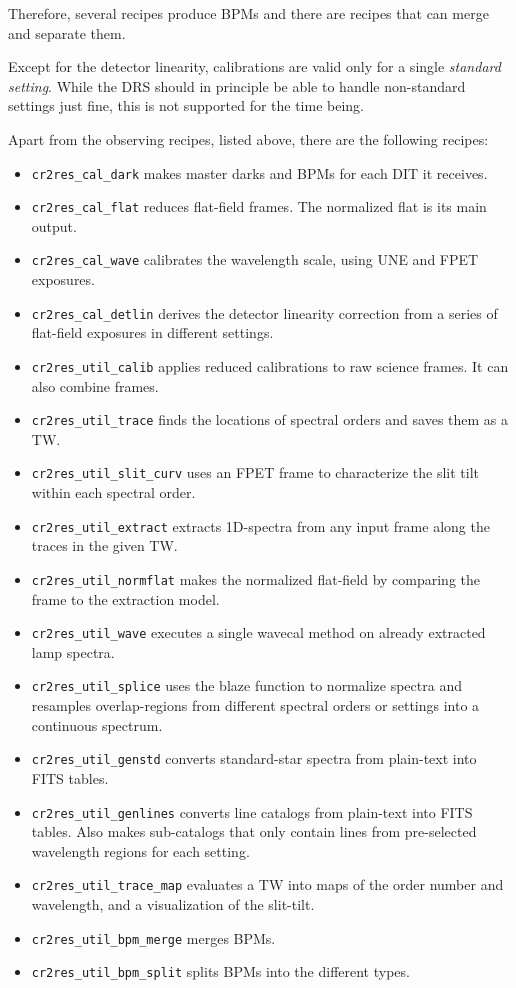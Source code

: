 Therefore, several recipes produce BPMs and there are recipes that can merge
and separate them.

Except for the detector linearity, calibrations are valid only for a
single \textit{standard setting}. While the DRS should in principle be able to
handle non-standard settings just fine, this is not supported for the time
being.

Apart from the observing recipes, listed above, there are the following recipes:

\begin{itemize}
    \item \texttt{cr2res\_cal\_dark} makes master darks and BPMs for each DIT it
    receives.
    \item \texttt{cr2res\_cal\_flat} reduces flat-field frames. The normalized
    flat is its main output.
    \item \texttt{cr2res\_cal\_wave} calibrates the wavelength scale, using UNE
    and FPET exposures.
    \item \texttt{cr2res\_cal\_detlin} derives the detector linearity correction
    from a series of flat-field exposures in different settings.
    \item \texttt{cr2res\_util\_calib} applies reduced calibrations to raw
    science frames. It can also combine frames.
    \item \texttt{cr2res\_util\_trace} finds the locations of spectral orders
    and saves them as a TW.
    \item \texttt{cr2res\_util\_slit\_curv} uses an FPET frame to characterize
    the slit tilt within each spectral order.
    \item \texttt{cr2res\_util\_extract} extracts 1D-spectra from any input frame
    along the traces in the given TW.
    \item \texttt{cr2res\_util\_normflat} makes the normalized flat-field by
    comparing the frame to the extraction model.
    \item \texttt{cr2res\_util\_wave} executes a single wavecal method on
    already extracted lamp spectra.
    \item \texttt{cr2res\_util\_splice} uses the blaze function to normalize
    spectra and resamples overlap-regions from different spectral orders or
    settings into a continuous spectrum.
    \item \texttt{cr2res\_util\_genstd} converts standard-star spectra from
    plain-text into FITS tables.
    \item \texttt{cr2res\_util\_genlines} converts line catalogs from plain-text
    into FITS tables. Also makes sub-catalogs that only contain lines from
    pre-selected wavelength regions for each setting.
    \item \texttt{cr2res\_util\_trace\_map} evaluates a TW into maps of the
    order number and wavelength, and a visualization of the slit-tilt.
    \item \texttt{cr2res\_util\_bpm\_merge} merges BPMs.
    \item \texttt{cr2res\_util\_bpm\_split} splits BPMs into the different
    types.
\end{itemize}

